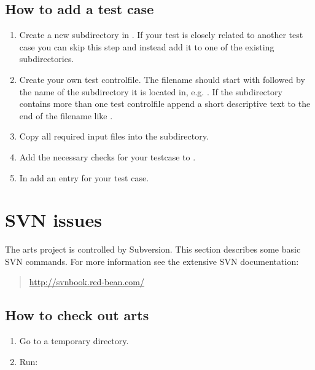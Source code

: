 \subsection{How to add a test case}
\begin{enumerate}
\item Create a new subdirectory in . If your test is closely
  related to another test case you can skip this step and instead add it
  to one of the existing subdirectories.
\item Create your own test controlfile. The filename should start with
   followed by the name of the subdirectory it is located in,
  e.g. . If the subdirectory contains more
  than one test controlfile append a short descriptive text to the end of the
  filename like .
\item Copy all required input files into the subdirectory.
\item Add the necessary checks for your testcase to
  .
\item In  add an entry for your test case.
\end{enumerate}


\section{SVN issues}
 \label{sec:development:cvs}

The arts project is controlled by Subversion. This section describes some
basic SVN commands. For more information see the extensive SVN
documentation:
\begin{quote}
  \url{http://svnbook.red-bean.com/}
\end{quote}




\subsection{How to check out arts}
\begin{enumerate}
\item Go to a temporary directory.
\item Run: 
\end{enumerate}


